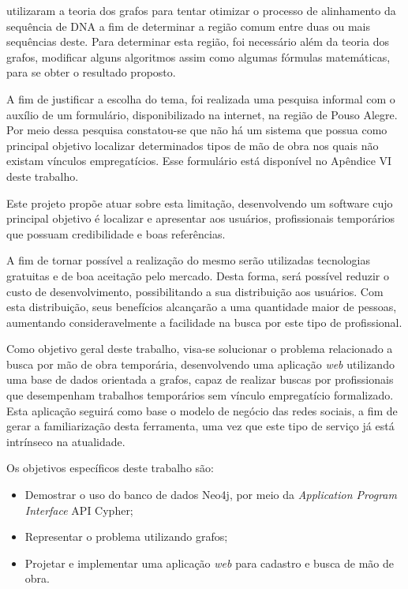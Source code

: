 \par {} utilizaram a teoria dos grafos para tentar otimizar o processo de alinhamento da sequência de DNA a fim de determinar a região comum entre duas ou mais sequências deste. Para determinar esta região, foi necessário além da teoria dos grafos, modificar alguns algoritmos assim como algumas fórmulas matemáticas, para se obter o resultado proposto.

\par A fim de justificar a escolha do tema, foi realizada uma pesquisa informal com o auxílio de um formulário, disponibilizado na internet, na região de Pouso Alegre. Por meio dessa pesquisa constatou-se que não há um sistema que possua como principal objetivo localizar determinados tipos de mão de obra nos quais não existam vínculos empregatícios. Esse formulário está disponível no Apêndice VI deste trabalho.

\par Este projeto propõe atuar sobre esta limitação, desenvolvendo um software cujo principal objetivo é localizar e apresentar aos usuários, profissionais temporários que possuam credibilidade e boas referências.

\par A fim de tornar possível a realização do mesmo serão utilizadas tecnologias gratuitas e de boa aceitação pelo mercado. Desta forma, será possível reduzir o custo de desenvolvimento, possibilitando a sua distribuição aos usuários. Com esta distribuição, seus benefícios alcançarão a uma quantidade maior de pessoas, aumentando consideravelmente a facilidade na busca por este tipo de profissional.

\par Como objetivo geral deste trabalho, visa-se solucionar o problema relacionado a busca por mão de obra temporária, desenvolvendo uma aplicação \textit{web} utilizando uma base de dados orientada a grafos, capaz de realizar buscas por profissionais que desempenham trabalhos temporários sem vínculo empregatício formalizado. Esta aplicação seguirá como base o modelo de negócio das redes sociais, a fim de gerar a familiarização desta ferramenta, uma vez que este tipo de serviço já está intrínseco na atualidade.

\par Os objetivos específicos deste trabalho são:

\begin{itemize}
	\item Demostrar o uso do banco de dados Neo4j, por meio da \textit{Application Program Interface} API Cypher;
	\item Representar o problema utilizando grafos;
	\item Projetar e implementar uma aplicação \textit{web} para cadastro e busca de mão de obra.
\end{itemize}

